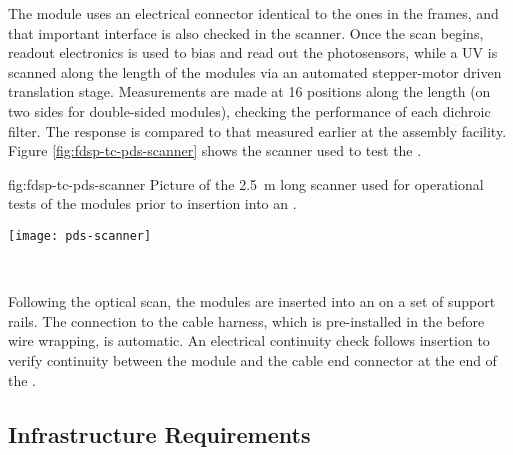 The  module uses an electrical connector identical to the ones in the  frames, and that important interface is also checked in the scanner.  
Once the scan begins,   readout electronics is used to bias and read out the photosensors, while a UV  is scanned along the length of the modules via an automated stepper-motor driven translation stage.  Measurements are made at 16 positions along the length (on two sides for double-sided  modules), checking the performance of each  dichroic filter. The response is compared to that measured earlier at the assembly facility. Figure \ref{fig:fdsp-tc-pds-scanner} shows the scanner used to test the  .

\begin{dunefigure}{fig:fdsp-tc-pds-scanner}
{Picture of the \SI{2.5}{m} long scanner used for operational tests of the   modules prior to insertion into an .} 

\texttt{[image: pds-scanner]}
\end{dunefigure}
\


Following the optical scan, the  modules are inserted into an   on a set of   support rails. The connection to the cable harness, which is pre-installed in the  before wire wrapping, is automatic. An electrical continuity check follows insertion to verify  continuity between the  module and the  cable end connector at the end of the .

\subsection{Infrastructure Requirements}%

